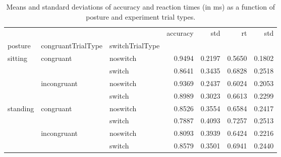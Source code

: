 \begin{table}
\centering
\caption{Means and standard deviations of accuracy and reaction times (in ms) as a function of posture and experiment trial types.}
\label{table-task-switching-replication-reaction-time}
\begin{tabular}{lllrrrr}
\toprule
         &             &        & accuracy &    std &     rt &    std \\
posture & congruantTrialType & switchTrialType &          &        &        &        \\
\midrule
sitting & congruant & noswitch &   0.9494 & 0.2197 & 0.5650 & 0.1802 \\
         &             & switch &   0.8641 & 0.3435 & 0.6828 & 0.2518 \\
         & incongruant & noswitch &   0.9369 & 0.2437 & 0.6024 & 0.2053 \\
         &             & switch &   0.8989 & 0.3023 & 0.6613 & 0.2299 \\
standing & congruant & noswitch &   0.8526 & 0.3554 & 0.6584 & 0.2417 \\
         &             & switch &   0.7887 & 0.4093 & 0.7257 & 0.2513 \\
         & incongruant & noswitch &   0.8093 & 0.3939 & 0.6424 & 0.2216 \\
         &             & switch &   0.8579 & 0.3501 & 0.6941 & 0.2440 \\
\bottomrule
\end{tabular}
\end{table}
